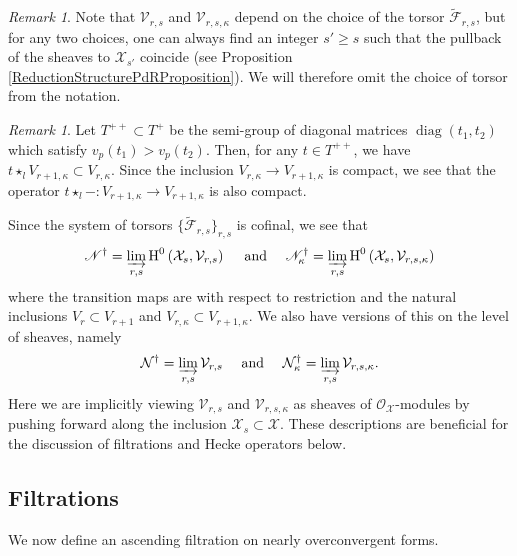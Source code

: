 \documentclass[10pt, oneside]{amsart}
\renewcommand{\tilde}{\widetilde}
\numberwithin{equation}{subsection}
\theoremstyle{definition}
\theoremstyle{remark}
\newtheorem{remark}[equation]{Remark}
\newcommand{\opn}[1]{\operatorname{#1}}
\begin{document}
\begin{remark}
    Note that $\mathcal{V}_{r, s}$ and $\mathcal{V}_{r, s, \kappa}$ depend on the choice of the torsor $\tilde{\mathcal{F}}_{r, s}$, but for any two choices, one can always find an integer $s' \geq s$ such that the pullback of the sheaves to $\mathcal{X}_{s'}$ coincide (see Proposition \ref{ReductionStructurePdRProposition}). We will therefore omit the choice of torsor from the notation.
\end{remark}

\begin{remark} \label{CompactOperatorOnVrkappaRem}
    Let $T^{++} \subset T^+$ be the semi-group of diagonal matrices $\opn{diag}(t_1, t_2)$ which satisfy $v_p(t_1) > v_p(t_2)$. Then, for any $t \in T^{++}$, we have $t \star_l V_{r+1, \kappa} \subset V_{r, \kappa}$. Since the inclusion $V_{r, \kappa} \to V_{r+1, \kappa}$ is compact, we see that the operator $t \star_l - \colon V_{r+1, \kappa} \to V_{r+1, \kappa}$ is also compact. 
\end{remark}

Since the system of torsors $\{ \tilde{\mathcal{F}}_{r, s} \}_{r, s}$ is cofinal, we see that
\[
\mathscr{N}^{\dagger} = \varinjlim_{r, s} \opn{H}^0\left( \mathcal{X}_s, \mathcal{V}_{r, s} \right) \quad \text{ and } \quad \mathscr{N}_{\kappa}^{\dagger} = \varinjlim_{r, s} \opn{H}^0\left( \mathcal{X}_s, \mathcal{V}_{r, s, \kappa} \right)
\]
where the transition maps are with respect to restriction and the natural inclusions $V_{r} \subset V_{r+1}$ and $V_{r, \kappa} \subset V_{r+1, \kappa}$. We also have versions of this on the level of sheaves, namely
\[
\mathcal{N}^{\dagger} = \varinjlim_{r, s} \mathcal{V}_{r, s} \quad \text{ and } \quad \mathcal{N}_{\kappa}^{\dagger} = \varinjlim_{r, s} \mathcal{V}_{r, s, \kappa} .
\]
Here we are implicitly viewing $\mathcal{V}_{r, s}$ and $\mathcal{V}_{r, s, \kappa}$ as sheaves of $\mathcal{O}_{\mathcal{X}}$-modules by pushing forward along the inclusion $\mathcal{X}_s \subset \mathcal{X}$. These descriptions are beneficial for the discussion of filtrations and Hecke operators below.

\subsection{Filtrations} \label{FiltrationsSubSec}

We now define an ascending filtration on nearly overconvergent forms.
\end{document}
